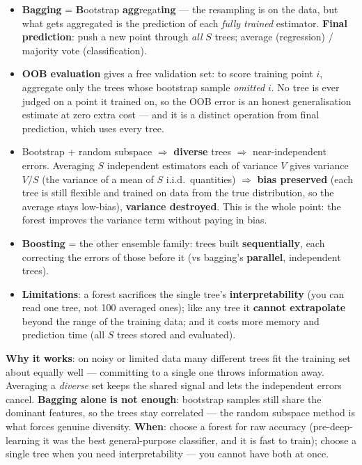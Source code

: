 \documentclass[11pt, a4paper]{article}
\newcommand{\kw}[1]{\textbf{#1}}
\begin{document}
\begin{itemize}
  \item \kw{Bagging} = \kw{B}ootstrap \kw{agg}regat\kw{ing} — the resampling is on the data, but what
  gets aggregated is the prediction of each \emph{fully trained} estimator. \kw{Final prediction}:
  push a new point through \emph{all} $S$ trees; average (regression) / majority vote (classification).
  \item \kw{OOB evaluation} gives a free validation set: to score training point $i$, aggregate only
  the trees whose bootstrap sample \emph{omitted} $i$. No tree is ever judged on a point it trained
  on, so the OOB error is an honest generalisation estimate at zero extra cost — and it is a distinct
  operation from final prediction, which uses every tree.
  \item Bootstrap + random subspace $\Rightarrow$ \kw{diverse} trees $\Rightarrow$ near-independent
  errors. Averaging $S$ independent estimators each of variance $V$ gives variance $V/S$ (the
  variance of a mean of $S$ i.i.d.\ quantities) $\Rightarrow$ \kw{bias preserved} (each tree is still
  flexible and trained on data from the true distribution, so the average stays low-bias),
  \kw{variance destroyed}. This is the whole point: the forest improves the variance term without
  paying in bias.
  \item \kw{Boosting} = the other ensemble family: trees built \kw{sequentially}, each correcting the
  errors of those before it (vs bagging's \kw{parallel}, independent trees).
  \item \kw{Limitations}: a forest sacrifices the single tree's \kw{interpretability} (you can read
  one tree, not 100 averaged ones); like any tree it \kw{cannot extrapolate} beyond the range of the
  training data; and it costs more memory and prediction time (all $S$ trees stored and evaluated).
\end{itemize}

\begin{notebox}
\kw{Why it works}: on noisy or limited data many different trees fit the training set about equally
well — committing to a single one throws information away. Averaging a \emph{diverse} set keeps the
shared signal and lets the independent errors cancel. \kw{Bagging alone is not enough}: bootstrap
samples still share the dominant features, so the trees stay correlated — the random subspace method
is what forces genuine diversity. \kw{When}: choose a forest for raw accuracy (pre-deep-learning it
was the best general-purpose classifier, and it is fast to train); choose a single tree when you
need interpretability — you cannot have both at once.
\end{notebox}
\end{document}
